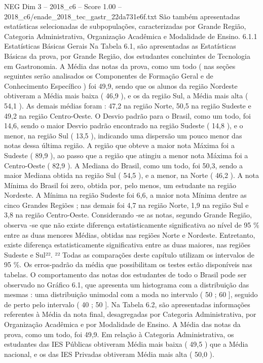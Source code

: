 \begin{textsample}{NEG Dim 3 – 2018\_c6 – Score 1.00 – 2018\_c6/enade\_2018\_tec\_gastr\_22da731e6f.txt}
São também apresentadas estatísticas selecionadas de subpopulações, caracterizadas por Grande Região, Categoria Administrativa, Organização Acadêmica e Modalidade de Ensino. 6.1.1 Estatísticas Básicas Gerais Na Tabela 6.1, são apresentadas as Estatísticas Básicas da prova, por Grande Região, dos estudantes concluintes de Tecnologia em Gastronomia.
A Média das notas da prova, como um todo ( nas seções seguintes serão analisados os Componentes de Formação Geral e de Conhecimento Específico ) foi 49,9, sendo que os alunos da região Nordeste obtiveram a Média mais baixa ( 46,9 ), e os da região Sul, a Média mais alta ( 54,1 ).
As demais médias foram : 47,2 na região Norte, 50,5 na região Sudeste e 49,2 na região Centro-Oeste.
O Desvio padrão para o Brasil, como um todo, foi 14,6, sendo o maior Desvio padrão encontrado na região Sudeste ( 14,8 ), e o menor, na região Sul ( 13,5 ), indicando uma dispersão um pouco menor das notas dessa última região.
A região que obteve a maior nota Máxima foi a Sudeste ( 89,9 ), ao passo que a região que atingiu a menor nota Máxima foi a Centro-Oeste ( 82,9 ).
A Mediana do Brasil, como um todo, foi 50,3, sendo a maior Mediana obtida na região Sul ( 54,5 ), e a menor, na Norte ( 46,2 ).
A nota Mínima do Brasil foi zero, obtida por, pelo menos, um estudante na região Nordeste.
A Mínima na região Sudeste foi 6,6, a maior nota Mínima dentre as cinco Grandes Regiões ; nas demais foi 4,7 na região Norte, 1,9 na região Sul e 3,8 na região Centro-Oeste.
Considerando -se as notas, segundo Grande Região, observa -se que não existe diferença estatisticamente significativa ao nível de 95 \% entre as duas menores Médias, obtidas nas regiões Norte e Nordeste.
Entretanto, existe diferença estatisticamente significativa entre as duas maiores, nas regiões Sudeste e Sul²². ²² Todas as comparações deste capítulo utilizam os intervalos de 95 \%.
Os erros-padrão da média que possibilitam os testes estão disponíveis nas tabelas.
O comportamento das notas dos estudantes de todo o Brasil pode ser observado no Gráfico 6.1, que apresenta um histograma com a distribuição das mesmas : uma distribuição unimodal com a moda no intervalo ( 50 ; 60 ], seguido de perto pelo intervalo ( 40 ; 50 ].
Na Tabela 6.2, são apresentadas informações referentes à Média da nota final, desagregadas por Categoria Administrativa, por Organização Acadêmica e por Modalidade de Ensino.
A Média das notas da prova, como um todo, foi 49,9.
Em relação à Categoria Administrativa, os estudantes das IES Públicas obtiveram Média mais baixa ( 49,5 ) que a Média nacional, e os das IES Privadas obtiveram Média mais alta ( 50,0 ).

\end{textsample}
